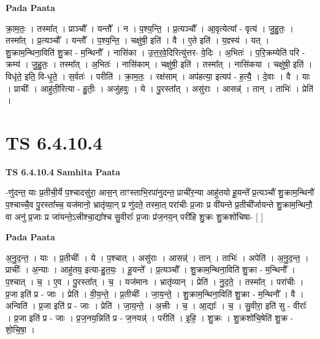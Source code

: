 \documentclass[17pt]{extarticle}
\begin{document}
\textbf{Pada Paata} \newline

क्रा॒म॒तः॒ । तस्मा᳚त् । प्राञ्चौ᳚ । यन्तौ᳚ । न । प॒श्य॒न्ति॒ । प्र॒त्यञ्चौ᳚ । आ॒वृत्येत्या᳚ - वृत्य॑ । जु॒हु॒तः॒ । तस्मा᳚त् । प्र॒त्यञ्चौ᳚ । यन्तौ᳚ । प॒श्य॒न्ति॒ । चक्षु॑षी॒ इति॑ । वै । ए॒ते इति॑ । य॒ज्ञ्स्य॑ । यत् । शु॒क्राम॒न्थिना॒विति॑ शु॒क्रा - म॒न्थिनौ᳚ । नासि॑का । उ॒त्त॒र॒वे॒दिरित्यु॑त्तर- वे॒दिः । अ॒भितः॑ । प॒रि॒क्रम्येति॑ परि - क्रम्य॑ । जु॒हु॒तः॒ । तस्मा᳚त् । अ॒भितः॑ । नासि॑काम् । चक्षु॑षी॒ इति॑ । तस्मा᳚त् । नासि॑कया । चक्षु॑षी॒ इति॑ । विधृ॑ते॒ इति॒ वि-धृ॒ते॒ । स॒र्वतः॑ । परीति॑ । क्रा॒म॒तः॒ । रक्ष॑साम् । अप॑हत्या॒ इत्यप॑ - ह॒त्यै॒ । दे॒वाः । वै । याः । प्राचीः᳚ । आहु॑ती॒रित्या - हु॒तीः॒ । अजु॑हवुः । ये । पु॒रस्ता᳚त् । असु॑राः । आसन्न्॑ । तान् । ताभिः॑ । प्रेति॑ ।  \newline





\section{ TS 6.4.10.4 }

\textbf{TS 6.4.10.4 } \newline
\textbf{Samhita Paata} \newline

-णु॑दन्त॒ याः प्र॒तीची॒र्ये प॒श्चादसु॑रा॒ आस॒न् ताꣳस्ताभि॒रपा॑नुदन्त॒ प्राची॑र॒न्या आहु॑तयो हू॒यन्ते᳚ प्र॒त्यञ्चौ॑ शु॒क्राम॒न्थिनौ॑ प॒श्चाच्चै॒व पु॒रस्ता᳚च्च॒ यज॑मानो॒ भ्रातृ॑व्या॒न् प्र णु॑दते॒ तस्मा॒त् परा॑चीः प्र॒जाः प्र वी॑यन्ते प्र॒तीची᳚र्जायन्ते शु॒क्राम॒न्थिनौ॒ वा अनु॑ प्र॒जाः प्र जा॑यन्ते॒ऽत्त्रीश्चा॒द्या᳚श्च सु॒वीराः᳚ प्र॒जाः प्र॑ज॒नय॒न् परी॑हि शु॒क्रः शु॒क्रशो॑चिषा- [  ] \newline

\textbf{Pada Paata} \newline

अ॒नु॒द॒न्त॒ । याः । प्र॒तीचीः᳚ । ये । प॒श्चात् । असु॑राः । आसन्न्॑ । तान् । ताभिः॑ । अपेति॑ । अ॒नु॒द॒न्त॒ । प्राचीः᳚ । अ॒न्याः । आहु॑तय॒ इत्या-हु॒त॒यः॒ । हू॒यन्ते᳚ । प्र॒त्यञ्चौ᳚ । शु॒क्राम॒न्थिना॒विति॑ शु॒क्रा - म॒न्थिनौ᳚ । प॒श्चात् । च॒ । ए॒व । पु॒रस्ता᳚त् । च॒ । यज॑मानः । भ्रातृ॑व्यान् । प्रेति॑ । नु॒द॒ते॒ । तस्मा᳚त् । परा॑चीः । प्र॒जा इति॑ प्र - जाः । प्रेति॑ । वी॒य॒न्ते॒ । प्र॒तीचीः᳚ । जा॒य॒न्ते॒ । शु॒क्राम॒न्थिना॒विति॑ शु॒क्रा - म॒न्थिनौ᳚ । वै । अन्विति॑ । प्र॒जा इति॑ प्र - जाः । प्रेति॑ । जा॒य॒न्ते॒ । अ॒त्त्रीः । च॒ । आ॒द्याः᳚ । च॒ । सु॒वीरा॒ इति॑ सु - वीराः᳚ । प्र॒जा इति॑ प्र - जाः । प्र॒ज॒नय॒न्निति॑ प्र - ज॒नयन्न्॑ । परीति॑ । इ॒हि॒ । शु॒क्रः । शु॒क्रशो॑चि॒षेति॑ शु॒क्र - शो॒चि॒षा॒ ।  \newline
\end{document}
